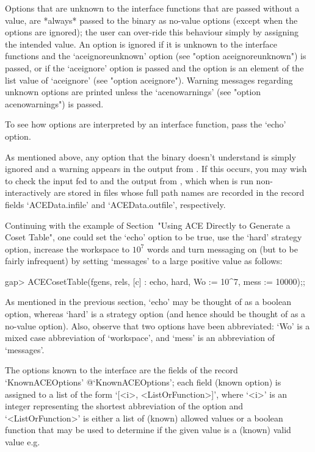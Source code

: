 Options that are unknown to the {\ACE} interface  functions  that  are
passed without a value, are *always* passed to the  {\ACE}  binary  as
no-value options (except when the options are ignored); the  user  can
over-ride this behaviour simply by assigning the  intended  value.  An
option is ignored if it is unknown to the {\ACE}  interface  functions
and the `aceignoreunknown' option (see "option  aceignoreunknown")  is
passed, or if the `aceignore' option is passed and the  option  is  an
element of the list value of  `aceignore'  (see  "option  aceignore").
Warning messages regarding unknown  options  are  printed  unless  the
`acenowarnings' (see "option acenowarnings") is passed.

To see how options are interpreted by an  {\ACE}  interface  function,
pass the `echo' option.

As  mentioned  above,  any  option  that  the  {\ACE}  binary  doesn't
understand is simply ignored and a warning appears in the output  from
{\ACE}. If this occurs, you may wish to check the input fed to  {\ACE}
and the output from {\ACE}, which when {\ACE} is run non-interactively
are stored in files whose full path names are recorded in  the  record
fields `ACEData.infile' and `ACEData.outfile', respectively.


Continuing with the example of Section~"Using ACE Directly to Generate
a Coset Table", one could set the `echo' option to be  true,  use  the
`hard' strategy option, increase the workspace  to  $10^7$  words  and
turn messaging on (but to be fairly infrequent) by setting  `messages'
to a large positive value as follows:

\beginexample
gap> ACECosetTable(fgens, rels, [c] : echo, hard, Wo := 10^7, mess := 10000);;
\endexample

As mentioned in the previous section, `echo' may be thought  of  as  a
boolean option, whereas `hard' is a strategy option (and hence  should
be thought of as a no-value option). Also, observe  that  two  options
have  been  abbreviated:  `Wo'  is  a  mixed  case   abbreviation   of
`workspace', and `mess' is an abbreviation of `messages'.


The {\ACE} options known to the {\ACE} interface are the fields of the
record          `KnownACEOptions'{\undoquotes{}
{@`KnownACEOptions'}}; each field (known {\ACE} option) is assigned to
a list of the  form  `[<i>,  <ListOrFunction>]',  where  `<i>'  is  an
integer representing the  shortest  abbreviation  of  the  option  and
`<ListOrFunction>' is either a list of (known)  allowed  values  or  a
boolean function that may be used to determine if the given value is a
(known) valid value e.g.


